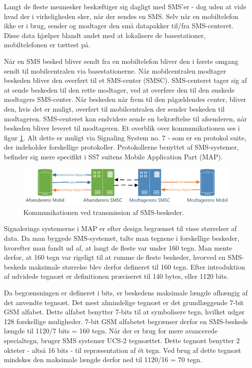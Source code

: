 Langt de fleste mennesker beskæftiger sig dagligt med SMS'er - dog uden at vide hvad der i virkeligheden sker, når der sendes en SMS. Selv når en mobiltelefon ikke er i brug, sender og modtager den små datapakker til/fra SMS-centeret. Disse data hjælper blandt andet med at lokalisere de basestationer, mobiltelefonen er tættest på.

Når en SMS besked bliver sendt fra en mobiltelefon bliver den i første omgang sendt til mobilcentralen via basestationerne. Når mobilcentralen modtager beskeden bliver den overført til et SMS-center (SMSC). SMS-centeret tager sig af at sende beskeden til den rette modtager, ved at overføre den til den ønskede modtagers SMS-center. Når beskeden når frem til den pågældendes center, bliver den, hvis det er muligt, overført til mobilcentralen der sender beskeden til modtageren. SMS-centeret kan endvidere sende en bekræftelse til afsenderen, når beskeden bliver leveret til modtageren. Et overblik over kommunikationen ses i figur \ref{smsTransm}. Alt dette er muligt via Signaling System no. 7 - som er en protokol suite, der indeholder forskellige protokoller. Protokollerne benyttet af SMS-systemer, befinder sig mere specifikt i SS7 suitens Mobile Application Part (MAP). \cite{Pro_1} \cite{sms_max1}

\noindent
\begin{figure}[hba]
\includegraphics[width=\linewidth]{Billeder/Mobil.png}
\caption {Kommunikationen ved transmission af SMS-beskeder.}
\label{smsTransm}
\end{figure}

Signalerings systemerne i MAP er efter design begrænset til visse størrelser af data. Da man byggede SMS-systemet, talte man tegnene i forskellige beskeder, hvorefter man fandt ud af, at langt de fleste var under 160 tegn. Man mente derfor, at 160 tegn var rigeligt til at rumme de fleste beskeder, hvorved en SMS-beskeds maksimale størrelse blev derfor defineret til 160 tegn. Efter introduktion af udvidede tegnsæt er definitionen præciseret til 140 bytes, eller 1120 bits. \cite{sms_max1} \cite{sms_max2}


Da begrænsningen er defineret i bits, er beskedens maksimale længde afhængig af det anvendte tegnsæt. Det mest almindelige tegnsæt er det grundlæggende 7-bit GSM alfabet. Dette alfabet benytter 7-bits til at symbolisere tegn, hvilket udgør 128 forskellige muligheder. 7-bit GSM alfabetet begrænser derfor en SMS-beskeds længde til 1120/7 bits = 160 tegn. Når der er brug for mere avancerede specialtegn, bruger SMS systemer UCS-2 tegnsættet. Dette tegnsæt benytter 2 okteter - altså 16 bits - til repræsentation af ét tegn. Ved brug af dette tegnsæt mindskes den maksimale længde derfor ned til 1120/16 = 70 tegn. \cite{sms_pdu}

